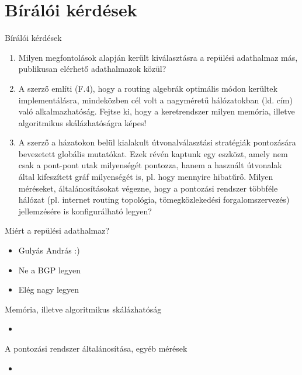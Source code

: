 \section*{Bírálói kérdések}
\begin{frame}{Bírálói kérdések}
  \begin{enumerate}
    \justifying
    \item Milyen megfontolások alapján került kiválasztásra a repülési adathalmaz más, publikusan elérhető adathalmazok közül?
    \item A szerző említi (F.4), hogy a routing algebrák optimális módon kerültek implementálásra, mindeközben cél volt a nagyméretű hálózatokban (ld. cím) való alkalmazhatóság. Fejtse ki, hogy a keretrendszer milyen memória, illetve algoritmikus skálázhatóságra képes!
    \item A szerző a házatokon belül kialakult útvonalválasztási stratégiák pontozására bevezetett globális mutatókat. Ezek révén kaptunk egy eszközt, amely nem csak a pont-pont utak milyenségét pontozza, hanem a használt útvonalak által kifeszített gráf milyenségét is, pl. hogy mennyire hibatűrő. Milyen méréseket, általánosításokat végezne, hogy a pontozási rendszer többféle hálózat (pl. internet routing topológia, tömegközlekedési forgalomszervezés) jellemzésére is konfigurálható legyen?
  \end{enumerate}
\end{frame}

\begin{frame}{Miért a repülési adathalmaz?}
  \begin{itemize}
    \item Gulyás András :) \todo
    \item Ne a BGP legyen
    \item Elég nagy legyen
  \end{itemize}
\end{frame}

\begin{frame}[<+->]{Memória, illetve algoritmikus skálázhatóság}
  \begin{itemize}
    \item \todo
  \end{itemize}
\end{frame}

\begin{frame}[<+->]{A pontozási rendszer általánosítása, egyéb mérések}
  \begin{itemize}
    \item \todo
  \end{itemize}
\end{frame}
